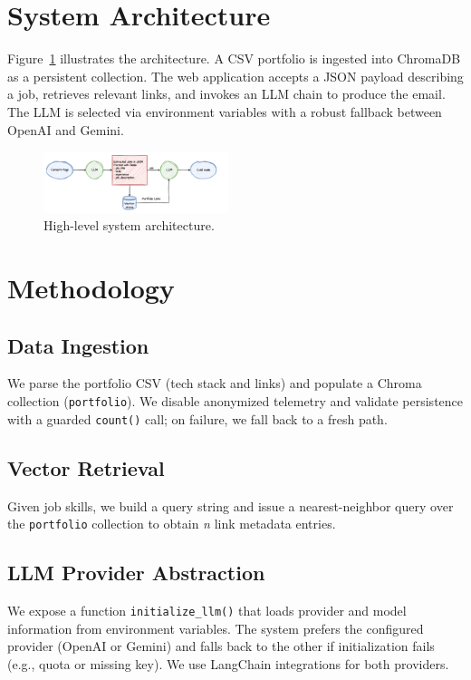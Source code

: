 \documentclass[conference]{IEEEtran}
\begin{document}
\section{System Architecture}
Figure~\ref{fig:arch} illustrates the architecture. A CSV portfolio is ingested into ChromaDB as a persistent collection. The web application accepts a JSON payload describing a job, retrieves relevant links, and invokes an LLM chain to produce the email. The LLM is selected via environment variables with a robust fallback between OpenAI and Gemini.

\begin{figure}[t]
  \centering
  \includegraphics[width=0.48\textwidth]{../imgs/architecture.png}
  \caption{High-level system architecture.}
  \label{fig:arch}
\end{figure}

\section{Methodology}
\subsection{Data Ingestion}
We parse the portfolio CSV (tech stack and links) and populate a Chroma collection (\texttt{portfolio}). We disable anonymized telemetry and validate persistence with a guarded \texttt{count()} call; on failure, we fall back to a fresh path.

\subsection{Vector Retrieval}
Given job skills, we build a query string and issue a nearest-neighbor query over the \texttt{portfolio} collection to obtain \textit{n} link metadata entries.

\subsection{LLM Provider Abstraction}
We expose a function \texttt{initialize\_llm()} that loads provider and model information from environment variables. The system prefers the configured provider (OpenAI or Gemini) and falls back to the other if initialization fails (e.g., quota or missing key). We use LangChain integrations for both providers.
\end{document}
